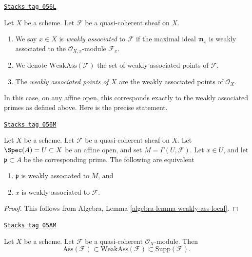 \begin{definition}
\label{divisors-definition-weakly-associated}
\href{https://stacks.math.columbia.edu/tag/056L}{\texttt{Stacks tag 056L}}

Let $X$ be a scheme.
Let $\mathcal{F}$ be a quasi-coherent sheaf on $X$.
\begin{enumerate}
\item We say $x \in X$ is {\it weakly associated} to $\mathcal{F}$
if the maximal ideal $\mathfrak m_x$ is weakly associated to the
$\mathcal{O}_{X, x}$-module $\mathcal{F}_x$.
\item We denote $\text{WeakAss}(\mathcal{F})$ the set of weakly associated
points of $\mathcal{F}$.
\item The {\it weakly associated points of $X$} are the weakly associated
points of $\mathcal{O}_X$.
\end{enumerate}
\end{definition}

In this case, on any affine open, this corresponds exactly to the
weakly associated primes as defined above. Here is the precise statement.

\begin{lemma}
\label{divisors-lemma-weakly-associated-affine-open}
\href{https://stacks.math.columbia.edu/tag/056M}{\texttt{Stacks tag 056M}}

Let $X$ be a scheme. Let $\mathcal{F}$ be a quasi-coherent sheaf on $X$.
Let $\Spec(A) = U \subset X$ be an affine open, and set
$M = \Gamma(U, \mathcal{F})$.
Let $x \in U$, and let $\mathfrak p \subset A$ be the corresponding prime.
The following are equivalent
\begin{enumerate}
\item $\mathfrak p$ is weakly associated to $M$, and
\item $x$ is weakly associated to $\mathcal{F}$.
\end{enumerate}
\end{lemma}

\begin{proof}
This follows from
Algebra, Lemma \ref{algebra-lemma-weakly-ass-local}.
\end{proof}

\begin{lemma}
\label{divisors-lemma-weakly-ass-support}
\href{https://stacks.math.columbia.edu/tag/05AM}{\texttt{Stacks tag 05AM}}

Let $X$ be a scheme.
Let $\mathcal{F}$ be a quasi-coherent $\mathcal{O}_X$-module.
Then
$$
\text{Ass}(\mathcal{F}) \subset \text{WeakAss}(\mathcal{F}) \subset
\text{Supp}(\mathcal{F}).
$$
\end{lemma}

